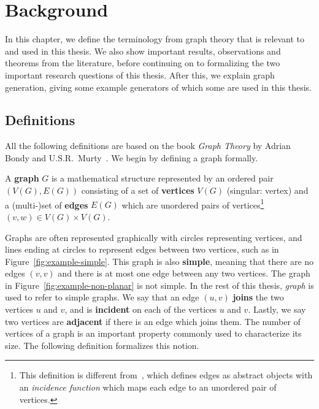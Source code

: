 \chapter{Background}
\label{cha:background}

In this chapter, we define the terminology from graph theory that is relevant to and used in this thesis. We also show important results, observations and theorems from the literature, before continuing on to formalizing the two important research questions of this thesis. After this, we explain graph generation, giving some example generators of which some are used in this thesis.

\section{Definitions}

All the following definitions are based on the book \textit{Graph Theory} by Adrian Bondy and U.S.R.\ Murty~\cite{book:bondy-definitions}. We begin by defining a graph formally.

\begin{definition}[Graph]
  A \textbf{graph} $G$ is a mathematical structure represented by an ordered pair $(V(G), E(G))$ consisting of a set of \textbf{vertices} $V(G)$ (singular: vertex) and a (multi-)set of \textbf{edges} $E(G)$ which are unordered pairs of vertices\footnote{This definition is different from~\cite{book:bondy-definitions}, which defines edges as abstract objects with an \textit{incidence function} which maps each edge to an unordered pair of vertices.} $(v,w) \in V(G) \times V(G)$.
\end{definition}

Graphs are often represented graphically with circles representing vertices, and lines ending at circles to represent edges between two vertices, such as in Figure~\ref{fig:example-simple}. This graph is also \textbf{simple}, meaning that there are no edges $(v,v)$ and there is at most one edge between any two vertices. The graph in Figure~\ref{fig:example-non-planar} is not simple. In the rest of this thesis, \emph{graph} is used to refer to simple graphs. We say that an edge $(u, v)$ \textbf{joins} the two vertices $u$ and $v$, and is \textbf{incident} on each of the vertices $u$ and $v$. Lastly, we say two vertices are \textbf{adjacent} if there is an edge which joins them. The number of vertices of a graph is an important property commonly used to characterize its size. The following definition formalizes this notion.

